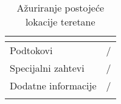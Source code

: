 \documentclass[../main.tex]{subfiles}
\begin{document}
\begin{longtable}{| p{} | p{} |}
\begin{itemize}
    \end{itemize}\\
\hline
    Podtokovi & /\\
\hline
    Specijalni zahtevi & /\\
\hline
    Dodatne informacije & /\\
\hline
\caption{Ažuriranje postojeće lokacije teretane} %
\end{longtable}
\end{document}
